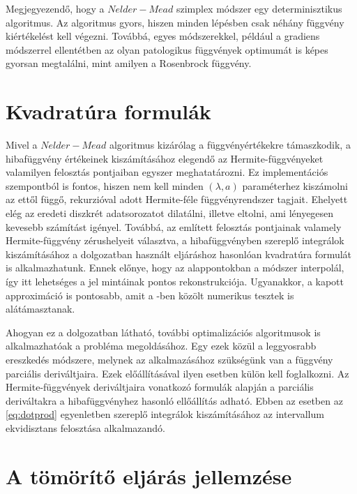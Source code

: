 \documentclass[oneside,titlepage,12pt,a4paper]{report}
\begin{document}
Megjegyezendő, hogy a $Nelder-Mead$ szimplex módszer egy determinisztikus algoritmus. Az algoritmus gyors, hiszen minden lépésben csak néhány függvény kiértékelést kell végezni. Továbbá, egyes módszerekkel, például a gradiens módszerrel ellentétben az olyan patologikus függvények optimumát is képes gyorsan megtalálni, mint amilyen a Rosenbrock függvény. 

\section{Kvadratúra formulák} \label{sec::kvad}


Mivel a $Nelder-Mead$ algoritmus
kizárólag a függvényértékekre támaszkodik, a hibafüggvény értékeinek kiszámításához elegendő az Hermite-függvényeket valamilyen felosztás pontjaiban egyszer meghatatározni. Ez implementációs szempontból is fontos, hiszen nem kell minden $(\lambda,a)$ paraméterhez kiszámolni az ettől függő, rekurzióval adott Hermite-féle függvényrendszer tagjait. Ehelyett elég az eredeti diszkrét adatsorozatot dilatálni, illetve eltolni, ami lényegesen kevesebb számítást igényel. Továbbá, az említett felosztás pontjainak valamely Hermite-függvény zérushelyeit választva, a hibafüggvényben  szereplő integrálok kiszámításához
a \cite{waveletOpt} dolgozatban használt eljáráshoz hasonlóan kvadratúra formulát is alkalmazhatunk. Ennek előnye, hogy az alappontokban a módszer interpolál, így itt lehetséges a jel mintáinak pontos rekonstrukciója. Ugyanakkor, a kapott approximáció is pontosabb, amit a \cite{waveletOpt}-ben közölt numerikus tesztek is alátámasztanak.
	\par Ahogyan ez a \cite{sajat} dolgozatban látható, további optimalizációs algoritmusok is alkalmazhatóak a probléma megoldásához. Egy ezek közül a leggyosrabb ereszkedés módszere, melynek az alkalmazásához 
szükségünk van a függvény parciális deriváltjaira. Ezek előállításával ilyen esetben
külön  kell foglalkozni. Az Hermite-függvények deriváltjaira vonatkozó formulák alapján a
parciális deriváltakra a hibafüggvényhez hasonló ellőállítás adható. Ebben az esetben az \eqref{eq:dotprod} egyenletben szereplő integrálok kiszámításához az intervallum ekvidisztans felosztása alkalmazandó.


\section{A tömörítő eljárás jellemzése} \label{sec::mp}
\end{document}
